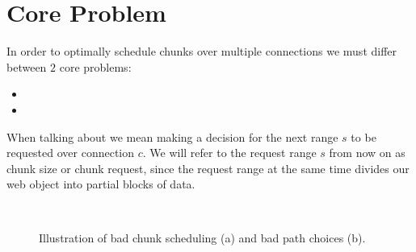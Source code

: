 \section{Core Problem}
\label{sec:core-problem}

In order to optimally schedule chunks over multiple connections we must differ between $2$ core problems:

\begin{itemize}
\item {}
\item {}
\end{itemize}

When talking about  we mean making a decision for the next range $s$ to be requested over connection $c$. 
We will refer to the request range $s$ from now on as chunk size or chunk request, since the request range at the same time divides our web object into partial blocks of data. 

\begin{figure}[t]
        \begin{minipage}[t]{0.5\linewidth}
		\begin{center}
        \end{center}
        \end{minipage}
~
        \begin{minipage}[t]{0.5\linewidth}
        \begin{center}
        \end{center}
        \end{minipage}
        \caption{\label{fig:bad-scheduling} Illustration of bad chunk scheduling (a) and bad path choices (b).}
  \vspace*{-0.3cm}
\end{figure}


